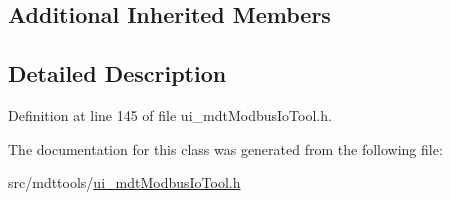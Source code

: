 \subsection*{Additional Inherited Members}


\subsection{Detailed Description}


Definition at line 145 of file ui\-\_\-mdt\-Modbus\-Io\-Tool.\-h.



The documentation for this class was generated from the following file\-:\begin{DoxyCompactItemize}
\item 
src/mdttools/\hyperlink{ui__mdt_modbus_io_tool_8h}{ui\-\_\-mdt\-Modbus\-Io\-Tool.\-h}\end{DoxyCompactItemize}
